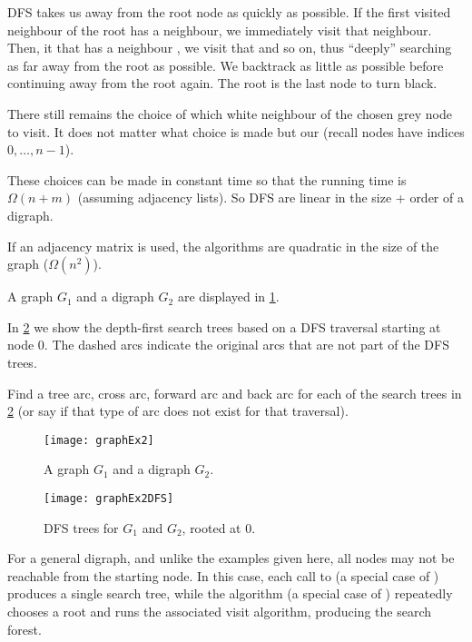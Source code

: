 
DFS  takes us away
from the root node as quickly as possible. If the first visited neighbour of the root has a neighbour, we immediately visit that neighbour. Then, it that has a neighbour , we visit that and so on, thus ``deeply''
searching as far away from the root as possible. We backtrack as little as possible before continuing away from the root again. The root is the last node to turn black.

There still remains the choice
of which white neighbour of the chosen grey node to visit. It does
not matter what choice is made but our  (recall nodes have indices $0, \dots, n - 1$). 

These choices can be made in constant time so that the running time is  $\Omega(n + m)$ (assuming adjacency lists). So DFS are linear in the size + order of a digraph. 

If an adjacency matrix is used, the algorithms are quadratic in the size of the graph ($\Omega(n^2)$).

\begin{Example}
\label{eg:graphExample2}
A graph $G_1$ and a digraph $G_2$ are displayed in
\cref{fig:graphExample2}.

In \cref{fig:graphEx2-DFS} we show the depth-first search trees based on a DFS traversal starting at node $0$. The
dashed arcs indicate the original arcs that are not part of the DFS trees.
\end{Example}



\begin{Boxample}[2]
Find a tree arc, cross arc, forward arc and back arc for each of the search trees in \cref{fig:graphEx2-DFS} (or say if that type of arc does not exist for that traversal).
\end{Boxample}


\begin{figure}[hbtp]
	\centering
	\texttt{[image: graphEx2]}
	\caption{A graph $G_1$ and a digraph $G_2$.}
	\label{fig:graphExample2}
\end{figure}



\begin{figure}[hbtp]
	\centering 
	\texttt{[image: graphEx2DFS]}
	\caption{DFS trees for $G_1$ and $G_2$, rooted at $0$.}
	\label{fig:graphEx2-DFS}
\end{figure}

For a general digraph, and unlike the examples given here, all nodes may not be reachable from the starting node. In this case, each call to  (a special case of ) produces a single search tree, while the algorithm  (a special case of ) repeatedly chooses a root and runs the associated visit algorithm, producing the search forest.

